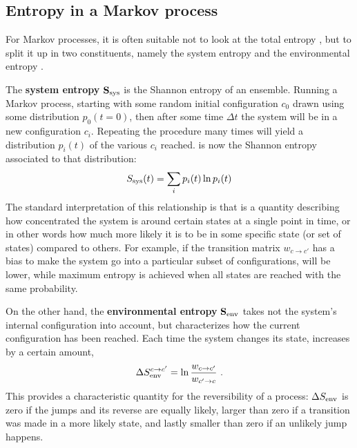 \subsection{Entropy in a Markov process}

For Markov processes, it is often suitable not to look at the total entropy \STot{}, but to split it up in two constituents, namely the system entropy \SSys{} and the environmental entropy \SEnv{}.

The \textbf{system entropy} \(\mathbf{S_\text{sys}{}}\) is the Shannon entropy of an ensemble. Running a Markov process, starting with some random initial configuration \(c_0\) drawn using some distribution \(p_0(t=0)\), then after some time \(\Delta t\) the system will be in a new configuration \(c_i\). Repeating the procedure many times will yield a distribution \(p_i(t)\) of the various \(c_i\) reached. \SSys{} is now the Shannon entropy associated to that distribution:
%
\begin{align}
	S_\text{sys}(t) = \sum_i p_i(t)\ln p_i(t)
\end{align}
%
The standard interpretation of this relationship is that \SSys{} is a quantity describing how concentrated the system is around certain states at a single point in time, or in other words how much more likely it is to be in some specific state (or set of states) compared to others. For example, if the transition matrix \(w_{c\to c'}\) has a bias to make the system go into a particular subset of configurations, \SSys will be lower, while maximum entropy is achieved when all states are reached with the same probability.

On the other hand, the \textbf{environmental entropy} \(\mathbf{S_\text{env}{}}\) takes not the system's internal configuration into account, but characterizes how the current configuration has been reached. Each time the system changes its state, \SEnv{} increases by a certain amount,
%
\begin{align}
	\label{eqn:SEnv single jump definition}
	\Delta S_\text{env}^{c\to c'} = \ln\frac{w_{c\to c'}}{w_{c'\to c}} ~.
\end{align}
%
This provides a characteristic quantity for the reversibility of a process: \(\Delta S_\text{env}\) is zero if the jumps and its reverse are equally likely, larger than zero if a transition was made in a more likely state, and lastly smaller than zero if an unlikely jump happens.

